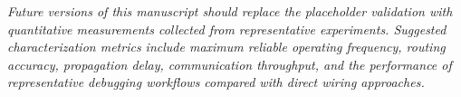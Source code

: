 \textit{Future versions of this manuscript should replace the placeholder validation with quantitative measurements collected from representative experiments. Suggested characterization metrics include maximum reliable operating frequency, routing accuracy, propagation delay, communication throughput, and the performance of representative debugging workflows compared with direct wiring approaches.}